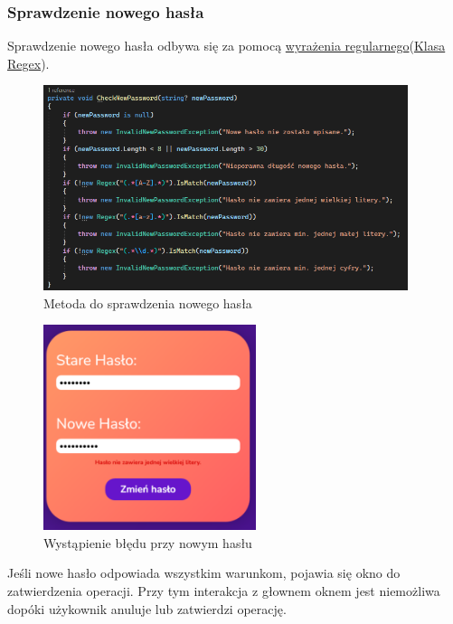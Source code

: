 \begin{flushleft}
    \subsubsection{\large{Sprawdzenie nowego hasła}}
    \hspace{5mm}Sprawdzenie nowego hasła odbywa się za pomocą {\color{blue}\href{https://en.wikipedia.org/wiki/Regular_expression}{wyrażenia regularnego}}({\color{blue}\href{https://learn.microsoft.com/en-us/dotnet/standard/base-types/regular-expression-language-quick-reference}{Klasa Regex}}).
    \begin{figure}[H]
        \begin{center}
	\includegraphics[height=6cm]{images/sprawdz_hasl.png}
        \caption{Metoda do sprawdzenia nowego hasła}
        \label{fig:sprawdz_hasl}
	\end{center}
    \end{figure}
    \begin{figure}[H]
        \begin{center}
	\includegraphics[height=6cm]{images/blad_nowe_hasl.png}
        \caption{Wystąpienie błędu przy nowym hasłu}
        \label{fig:blad_nowe_haslo}
	\end{center}
    \end{figure}
    \hspace{5mm}Jeśli nowe hasło odpowiada wszystkim warunkom, pojawia się okno do zatwierdzenia operacji. Przy tym interakcja z głownem oknem jest niemożliwa dopóki użykownik anuluje lub zatwierdzi operację.

\end{flushleft}
